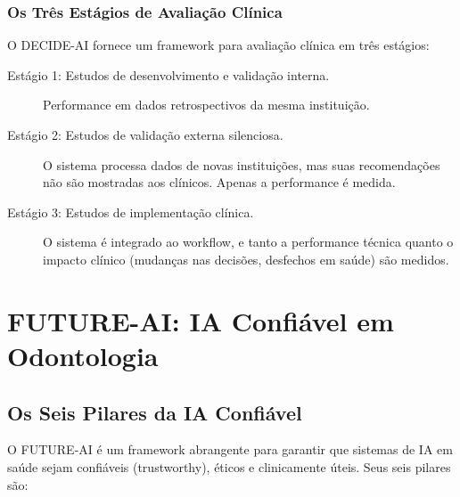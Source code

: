 \subsubsection{Os Três Estágios de Avaliação Clínica}

O DECIDE-AI fornece um framework para avaliação clínica em três estágios:

\begin{description}
    \item[Estágio 1: Estudos de desenvolvimento e validação interna.] Performance em dados retrospectivos da mesma instituição.
    \item[Estágio 2: Estudos de validação externa silenciosa.] O sistema processa dados de novas instituições, mas suas recomendações não são mostradas aos clínicos. Apenas a performance é medida.
    \item[Estágio 3: Estudos de implementação clínica.] O sistema é integrado ao workflow, e tanto a performance técnica quanto o impacto clínico (mudanças nas decisões, desfechos em saúde) são medidos.
\end{description}

\section{FUTURE-AI: IA Confiável em Odontologia}

\subsection{Os Seis Pilares da IA Confiável}

O FUTURE-AI  é um framework abrangente para garantir que sistemas de IA em saúde sejam confiáveis (trustworthy), éticos e clinicamente úteis. Seus seis pilares são:

